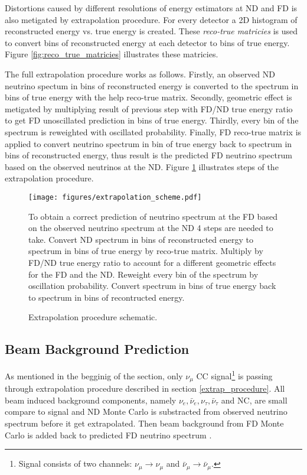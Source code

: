 Distortions caused by different resolutions of energy estimators at ND and FD is also metigated by
extrapolation procedure. For every detector a 2D histogram of reconstructed energy vs. true energy
is created. These \textit{reco-true matricies} is used to convert bins of reconstructed energy at
each detector to bins of true energy. Figure \ref{fig:reco_true_matricies} illustrates these matricies.

The full extrapolation procedure works as follows. Firstly, an observed ND neutrino spectum in bins of 
reconstructed energy is converted to the spectrum in bins of true energy with the help reco-true 
matrix. Secondly, geometric effect is metigated by multiplying result of previous step with FD/ND 
true energy ratio to get FD unoscillated prediction in bins of true energy. Thirdly, every bin of the 
spectrum is reweighted with oscillated probability. Finally, FD reco-true matrix is applied to 
convert neutrino spectrum in bin of true energy back to spectrum in bins of reconstructed energy,
thus result is the predicted FD neutrino spectrum based on the observed neutrinos at the ND. 
Figure \ref{fig:extrap_scheme} illustrates steps of the extrapolation procedure.
\begin{figure}[!h]
\centering
\texttt{[image: figures/extrapolation\_scheme.pdf]}
\caption{Extrapolation procedure schematic.}
{To obtain a correct prediction of neutrino spectrum at the FD based on the observed neutrino 
spectrum at the ND 4 steps are needed to take. Convert ND spectrum in bins of reconstructed energy to
spectrum in bins of true energy by reco-true matrix. Multiply by FD/ND true energy ratio to account
for a different geometric effects for the FD and the ND. Reweight every bin of the spectrum by
oscillation probability. Convert spectrum in bins of true energy back to spectrum in bins of
recontructed energy. }
\label{fig:extrap_scheme}
\end{figure}

\subsection{Beam Background Prediction}
As mentioned in the begginig of the section, only $\nu_\mu$ CC signal\footnote{Signal consists of two
channels: $\nu_\mu \rightarrow \nu_\mu$ and $\bar\nu_\mu \rightarrow \bar\nu_\mu$.} is passing 
through extrapolation procedure described in section \ref{extrap_procedure}. All beam induced 
background components, namely $\nu_e, \bar\nu_e, \nu_\tau, \bar\nu_\tau$ and NC, are small compare 
to signal and ND Monte Carlo is substracted from observed neutrino spectrum before it get extrapolated.
Then beam background from FD Monte Carlo is added back to predicted FD neutrino spectrum \cite{extrap_technote}. 

